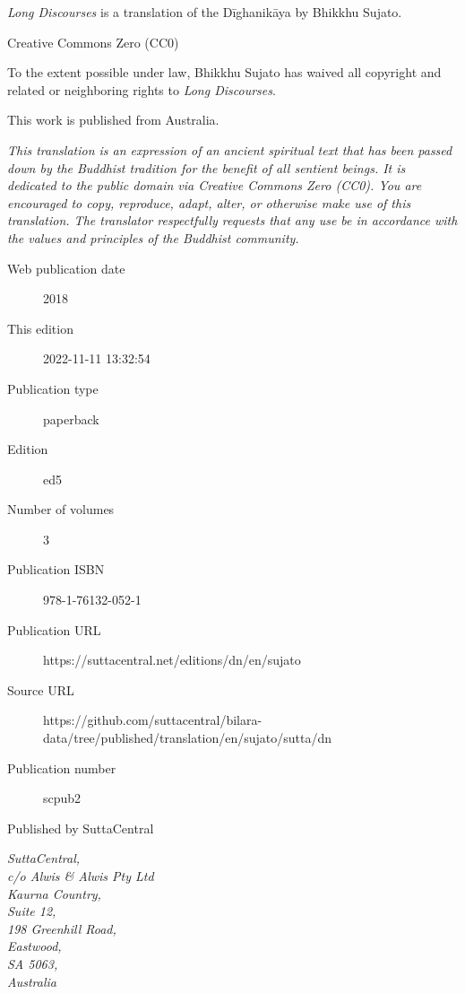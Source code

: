 \documentclass[12pt,openany]{book}%
\begin{document}
\begin{footnotesize}

\textit{Long Discourses} is a translation of the Dīghanikāya by Bhikkhu Sujato.

\medskip

Creative Commons Zero (CC0)

To the extent possible under law, Bhikkhu Sujato has waived all copyright and related or neighboring rights to \textit{Long Discourses}.

\medskip

This work is published from Australia.

\begin{center}
\textit{This translation is an expression of an ancient spiritual text that has been passed down by the Buddhist tradition for the benefit of all sentient beings. It is dedicated to the public domain via Creative Commons Zero (CC0). You are encouraged to copy, reproduce, adapt, alter, or otherwise make use of this translation. The translator respectfully requests that any use be in accordance with the values and principles of the Buddhist community.}
\end{center}

\medskip

\begin{description}
    \item[Web publication date] 2018
    \item[This edition] 2022-11-11 13:32:54
    \item[Publication type] paperback
    \item[Edition] ed5
    \item[Number of volumes] 3
    \item[Publication ISBN] 978-1-76132-052-1
    \item[Publication URL] https://suttacentral.net/editions/dn/en/sujato
    \item[Source URL] https://github.com/suttacentral/bilara-data/tree/published/translation/en/sujato/sutta/dn
    \item[Publication number] scpub2
\end{description}

\medskip

Published by SuttaCentral

\medskip

\textit{SuttaCentral,\\
c/o Alwis \& Alwis Pty Ltd\\
Kaurna Country,\\
Suite 12,\\
198 Greenhill Road,\\
Eastwood,\\
SA 5063,\\
Australia}

\end{footnotesize}
\end{document}
